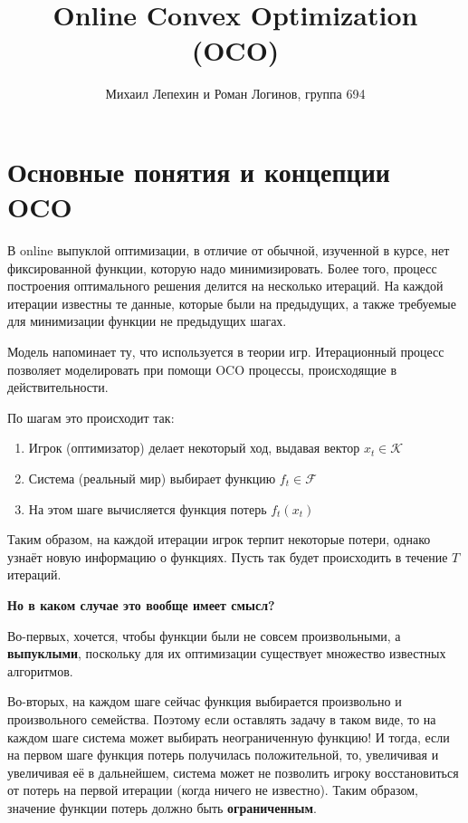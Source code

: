 \documentclass[12pt]{article}
\author{Михаил Лепехин и Роман Логинов, группа 694}
\title{Online Convex Optimization (OCO)}
\theoremstyle{definition}
\begin{document}
  \maketitle

\section*{Основные понятия и концепции OCO}

\bigskip
В online выпуклой оптимизации, в отличие от обычной, изученной в курсе, нет фиксированной функции, которую надо минимизировать. Более того, процесс построения оптимального решения делится на несколько итераций. На каждой итерации известны те данные, которые были на предыдущих, а также требуемые для минимизации функции не предыдущих шагах.

Модель напоминает ту, что используется в теории игр. Итерационный процесс позволяет моделировать при помощи OCO процессы, происходящие в действительности.

По шагам это происходит так:

\begin{enumerate}
	\item Игрок (оптимизатор) делает некоторый ход, выдавая вектор $x_t \in \mathcal{K}$
	\item Система (реальный мир) выбирает функцию $f_t \in \mathcal{F}$
	\item На этом шаге вычисляется функция потерь $f_t(x_t)$
\end{enumerate}

Таким образом, на каждой итерации игрок терпит некоторые потери, однако узнаёт новую информацию о функциях. Пусть так будет происходить в течение $T$ итераций.

\bigskip
\textbf{Но в каком случае это вообще имеет смысл?}
\bigskip

Во-первых, хочется, чтобы функции были не совсем произвольными, а \textbf{выпуклыми}, поскольку для их оптимизации существует множество известных алгоритмов.

Во-вторых, на каждом шаге сейчас функция выбирается произвольно и произвольного семейства. Поэтому если оставлять задачу в таком виде, то на каждом шаге система может выбирать неограниченную функцию! И тогда, если на первом шаге функция потерь получилась положительной, то, увеличивая и увеличивая её в дальнейшем, система может не позволить игроку восстановиться от потерь на первой итерации (когда ничего не известно). Таким образом, значение функции потерь должно быть \textbf{ограниченным}.
\end{document}
